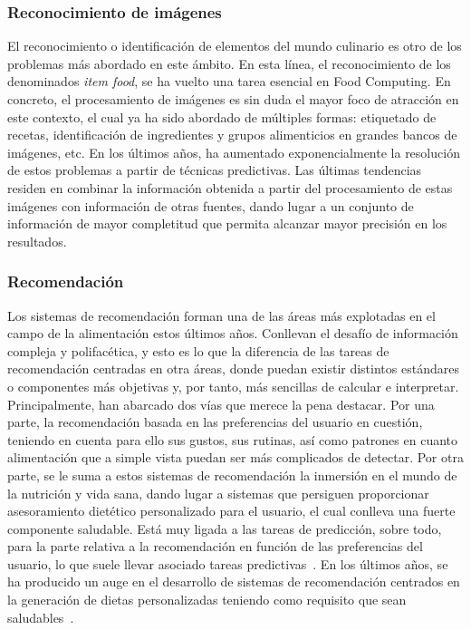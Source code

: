 \subsubsection{Reconocimiento de imágenes}
El reconocimiento o identificación de elementos del mundo culinario es otro de los problemas más abordado en este ámbito. En esta línea, el reconocimiento de los denominados \textit{item food}, se ha vuelto una tarea esencial en Food Computing. En concreto, el procesamiento de imágenes es sin duda el mayor foco de atracción en este contexto, el cual ya ha sido abordado de múltiples formas: etiquetado de recetas, identificación de ingredientes y grupos alimenticios en grandes bancos de imágenes, etc. En los últimos años, ha aumentado exponencialmente la resolución de estos problemas a partir de técnicas predictivas. Las últimas tendencias residen en combinar la información obtenida a partir del procesamiento de estas imágenes con información de otras fuentes, dando lugar a un conjunto de información de mayor completitud que permita alcanzar mayor precisión en los resultados.

\subsubsection{Recomendación}
Los sistemas de recomendación forman una de las áreas más explotadas en el campo de la alimentación estos últimos años. Conllevan el desafío de información compleja y polifacética, y esto es lo que la diferencia de las tareas de recomendación centradas en otra áreas, donde puedan existir distintos estándares o componentes más objetivas y, por tanto, más sencillas de calcular e interpretar. Principalmente, han abarcado dos vías que merece la pena destacar. Por una parte, la recomendación basada en las preferencias del usuario en cuestión, teniendo en cuenta para ello sus gustos, sus rutinas, así como patrones en cuanto alimentación que a simple vista puedan ser más complicados de detectar. Por otra parte, se le suma a estos sistemas de recomendación la inmersión en el mundo de la nutrición y vida sana, dando lugar a sistemas que persiguen proporcionar asesoramiento dietético personalizado para el usuario, el cual conlleva una fuerte componente saludable. Está muy ligada a las tareas de predicción, sobre todo, para la parte relativa a la recomendación en función de las preferencias del usuario, lo que suele llevar asociado tareas predictivas~\cite{min2019survey}. En los últimos años, se ha producido un auge en el desarrollo de sistemas de recomendación centrados en la generación de dietas personalizadas teniendo como requisito que sean saludables~\cite{Trattner2017}. 


